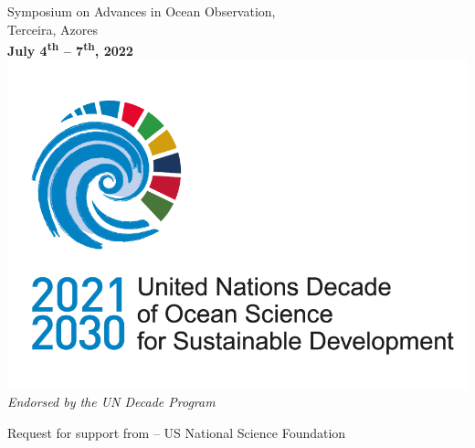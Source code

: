 
\begin{titlepage}

  \begin{center}
\Large{Symposium on Advances in Ocean Observation,\\
  Terceira, Azores\\
  \large{\textbf{July 4\textsuperscript{th} -- 7\textsuperscript{th},
      2022}}\\
}
\vspace{+1cm}
\hspace{+0.5cm}\href{https://www.oceandecade.org/}{\includegraphics[scale=0.5]{fig/un-decade.png}}\\
\small{\emph{Endorsed by the UN Decade Program}}
\vspace{+2.5cm}

  \large{Request for support from \nsf -- US National Science Foundation}\\
\vspace{+4.5in}
  \small{
    \\
  }
\end{center}
\end{titlepage}